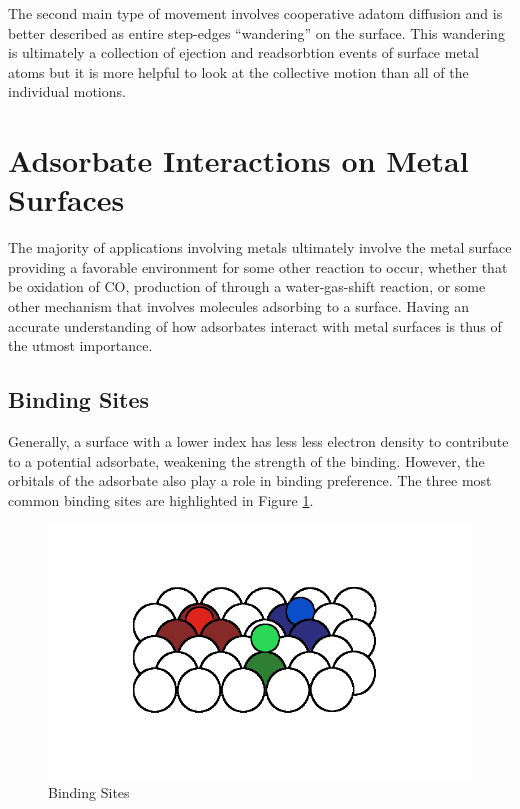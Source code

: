 The second main type of movement involves cooperative adatom diffusion and is
better described as entire step-edges ``wandering'' on the surface. This
wandering is ultimately a collection of ejection and readsorbtion events of
surface metal atoms but it is more helpful to look at the collective motion
than all of the individual motions.

\section{Adsorbate Interactions on Metal Surfaces}
The majority of applications involving metals ultimately involve the metal
surface providing a favorable environment for some other reaction to occur,
whether that be oxidation of CO, production of  through a
water-gas-shift reaction, or some other mechanism that involves molecules
adsorbing to a surface. Having an accurate understanding of how adsorbates
interact with metal surfaces is thus of the utmost importance. 

\subsection{Binding Sites}
Generally, a surface with a lower index has less less electron density to
contribute to a potential adsorbate, weakening the strength of the binding.
However, the orbitals of the adsorbate also play a role in binding preference.
The three most common binding sites are highlighted in Figure
\ref{fig:binding}.
\begin{figure}
  \includegraphics[width=\linewidth]{../figures/chap1/binding.pdf}
  \caption{Binding Sites}
\label{fig:binding}
\end{figure}


